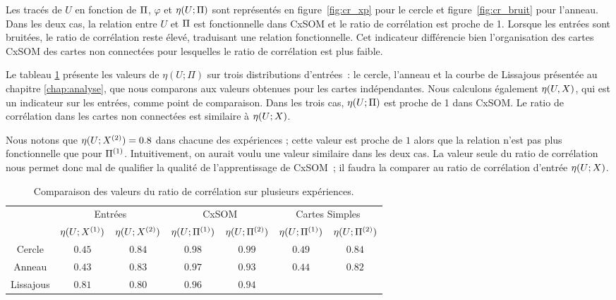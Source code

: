 \documentclass[../main]{subfiles}
\begin{document}
Les tracés de $U$ en fonction de $\Pi$, $\varphi$ et $\eta(U;\Pi)$ sont représentés en figure~\ref{fig:cr_xp} pour le cercle et figure~\ref{fig:cr_bruit} pour l'anneau.
Dans les deux cas, la relation entre $U$ et $\Pi$ est fonctionnelle dans CxSOM et le ratio de corrélation est proche de 1. Lorsque les entrées sont bruitées, le ratio de corrélation reste élevé, traduisant une relation fonctionnelle.
Cet indicateur différencie bien l'organisation des cartes CxSOM des cartes non connectées pour lesquelles le ratio de corrélation est plus faible.

Le tableau \ref{tab:eta} présente les valeurs de $\eta(U;\Pi)$ sur trois distributions d'entrées~: le cercle, l'anneau et la courbe de Lissajous présentée au chapitre \ref{chap:analyse}, que nous comparons aux valeurs obtenues pour les cartes indépendantes. Nous calculons également $\eta(U,X)$, qui est un indicateur sur les entrées, comme point de comparaison.
Dans les trois cas, $\eta(U;\Pi)$ est proche de 1 dans CxSOM. Le ratio de corrélation dans les cartes non connectées est similaire à $\eta(U;X)$.

Nous notons que $\eta(U;X^{({2})}) = 0.8$ dans chacune des expériences ; cette valeur est proche de $1$ alors que la relation n'est pas \og plus fonctionnelle \fg{} que pour $\Pi^{({1})}$. Intuitivement, on aurait voulu une valeur similaire dans les deux cas.
La valeur seule du ratio de corrélation nous permet donc mal de qualifier la qualité de l'apprentissage de CxSOM~; il faudra la comparer au ratio de corrélation d'entrée $\eta(U;X)$.

\begin{table}
    \centering
    \caption{Comparaison des valeurs du ratio de corrélation sur plusieurs expériences.\label{tab:eta}}
    \begin{tabular}{*7c}
        \toprule
        & \multicolumn{2}{c}{Entrées} & \multicolumn{2}{c}{CxSOM} & \multicolumn{2}{c}{Cartes Simples} \\
        \cmidrule(lr){2-7}
         & $\eta(U;X^{({1})})$ & $\eta(U;X^{({2})})$  & $\eta(U;\Pi^{({1})})$ & $\eta(U;\Pi^{({2})})$  & $\eta(U;\Pi^{({1})})$ & $\eta(U;\Pi^{({2})})$ \\    
        \midrule
        Cercle &   $0.45 $    & $0.84$  &  $0.98$ & $0.99$ & $0.49$ & $0.84$      \\
        Anneau &  $0.43$      &  $0.83$      & $0.97$ & $0.93$ & $0.44$ & $0.82$ \\
        Lissajous &  $0.81$     &  $0.80$ & $0.96$ & $0.94$  & & \\
        \bottomrule
    \end{tabular}
\end{table}
\end{document}
